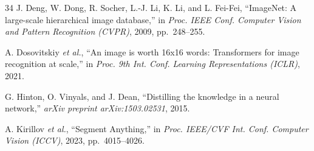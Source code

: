 \documentclass[conference]{IEEEtran}
\begin{document}
\begin{thebibliography}{34}
J. Deng, W. Dong, R. Socher, L.-J. Li, K. Li, and L. Fei-Fei, ``ImageNet: A large-scale hierarchical image database,'' in \textit{Proc. IEEE Conf. Computer Vision and Pattern Recognition (CVPR)}, 2009, pp.~248--255.

A. Dosovitskiy \textit{et al.}, ``An image is worth 16x16 words: Transformers for image recognition at scale,'' in \textit{Proc. 9th Int. Conf. Learning Representations (ICLR)}, 2021.

G. Hinton, O. Vinyals, and J. Dean, ``Distilling the knowledge in a neural network,'' \textit{arXiv preprint arXiv:1503.02531}, 2015.

A. Kirillov \textit{et al.}, ``Segment Anything,'' in \textit{Proc. IEEE/CVF Int. Conf. Computer Vision (ICCV)}, 2023, pp.~4015--4026.

\end{thebibliography}
\end{document}
